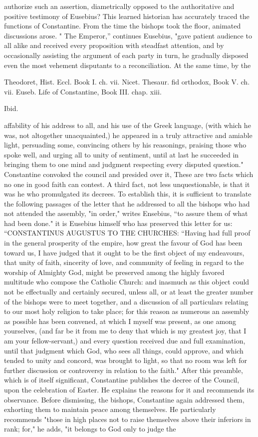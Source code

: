 authorize such an assertion, diametrically opposed to the authoritative and positive testimony of Eusebius? This learned historian has accurately traced the functions of Constantine. From the time the bishops took the floor, animated discussions arose. " The Emperor,” continues Eusebius, "gave patient audience to all alike and received every proposition with steadfast attention, and by occasionally assisting the argument of each party in turn, he gradually disposed even the most vehement disputants to a reconciliation. At the same time, by the

Theodoret, Hist. Eccl. Book I. ch. vii. Nicet. Thesaur. fid orthodox, Book V. ch. vii. Euseb. Life of Constantine, Book III. chap. xiii.

Ibid.

affability of his address to all, and his use of the Greek language, (with which he was, not altogether unacquainted,) he appeared in a truly attractive and amiable light, persuading some, convincing others by his reasonings, praising those who spoke well, and urging all to unity of sentiment, until at last he succeeded in bringing them to one mind and judgment respecting every disputed question." Constantine convoked the council and presided over it, These are two facts which no one in good faith can contest. A third fact, not less unquestionable, is that it was he who promulgated its decrees. To establish this, it is sufficient to translate the following passages of the letter that he addressed to all the bishops who had not attended the assembly, "in order," writes Ensebius, “to assure them of what had been done." it is Eusebius himself who has preserved this letter for us: “CONSTANTINUS AUGUSTUS TO THE CHURCHES: “Having had full proof in the general prosperity of the empire, how great the favour of God has been toward us, I have judged that it ought to be the first object of my endeavours, that unity of faith, sincerity of love, and community of feeling in regard to the worship of Almighty God, might be preserved among the highly favored multitude who compose the Catholic Church: and inasmuch as this object could not be effectually and certainly secured, unless all, or at least the greater number of the bishops were to meet together, and a discussion of all particulars relating to our most holy religion to take place; for this reason as numerous an assembly as possible has been convened, at which I myself was present, as one among yourselves, (and far be it from me to deny that which is my greatest joy, that I am your fellow-servant,) and every question received due and full examination, until that judgment which God, who sees all things, could approve, and which tended to unity and concord, was brought to light, so that no room was left for further discussion or controversy in relation to the faith." After this preamble, which is of itself significant, Constantine publishes the decree of the Council, upon the celebration of Easter. He explains the reasons for it and recommends its observance. Before dismissing, the bishops, Constantine again addressed them, exhorting them to maintain peace among themselves. He particularly recommends "those in high places not to raise themselves above their inferiors in rank; for," he adds, "it belongs to God only to judge the 